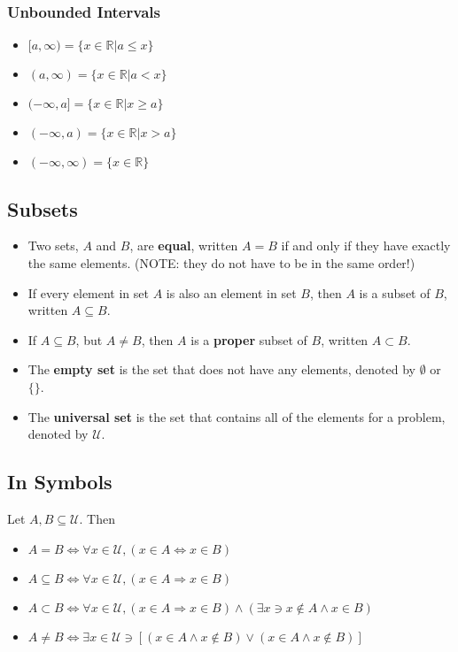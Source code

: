 \documentclass[10pt,reqno]{book}
\theoremstyle{plain}
\def\R{\mathbb{R}}
\def\U{\mathcal{U}}
\begin{document}
	\subsubsection*{Unbounded Intervals}
	
	\begin{itemize}
		\item $ [a,\infty) = \{ x \in \R | a \leq x \} $
		\item $ (a,\infty) = \{ x \in \R | a < x \} $
		\item $ (-\infty, a] = \{ x \in \R | x \geq a \} $
		\item $ (-\infty, a) = \{ x \in \R | x > a \} $
		\item $ (-\infty,\infty) = \{ x \in \R \} $
	\end{itemize}
	
	
	\subsection*{Subsets}
	
	\begin{itemize}
		\item Two sets, $ A $ and $ B $, are \textbf{equal}, written $ A = B $ if and only if they have exactly the same elements. (NOTE: they do not have to be in the same order!)
		\item If every element in set $ A $ is also an element in set $ B $, then $ A $ is a subset of $ B $, written $ A \subseteq B $.
		\item If $ A \subseteq B $, but $ A \neq B $, then $ A $ is a \textbf{proper} subset of $ B $, written $ A \subset B $.
		\item The \textbf{empty set} is the set that does not have any elements, denoted by $ \emptyset $ or $ \{\} $.
		\item The \textbf{universal set} is the set that contains all of the elements for a problem, denoted by $ \U $.
	\end{itemize}

	\subsection*{In Symbols}
	
	Let $ A,B \subseteq \U $. Then
	
	\begin{itemize}
		\item $ A = B \Leftrightarrow \forall x \in \U, (x \in A \Leftrightarrow x \in B) $
		\item $ A \subseteq B \Leftrightarrow \forall x \in \U, (x \in A \Rightarrow x \in B) $
		\item $ A \subset B \Leftrightarrow \forall x \in \U, (x \in A \Rightarrow x \in B) \wedge (\exists x \ni x \notin A \wedge x \in B) $
		\item $ A \neq B \Leftrightarrow \exists x \in \U \ni [(x \in A \wedge x \notin B) \vee (x \in A \wedge x \notin B)] $
	\end{itemize}
\end{document}
